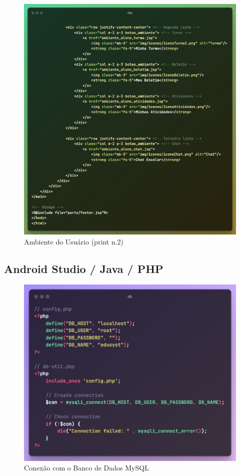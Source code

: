 \documentclass[main.tex]{subfiles}
\begin{document}
\begin{figure}[H]
    \centering
    \includegraphics[scale=0.63]{imagens/code_scrs/7-ambienteSite2}
    \caption{Ambiente do Usuário (print n.2)}
\end{figure}

\subsection{Android Studio / Java / PHP}
\begin{figure}[H]
    \centering
    \includegraphics[scale=0.6]{imagens/code_scrs/8-andDb}
    \caption{Conexão com o Banco de Dados MySQL}
\end{figure}
\end{document}
